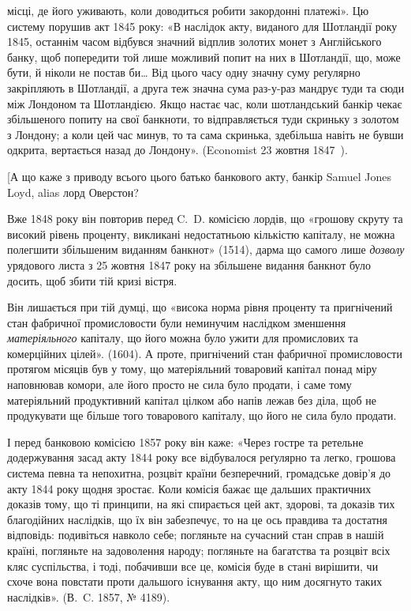 \parcont{}  %
місці, де його уживають, коли доводиться робити закордонні платежі». Цю систему
порушив акт 1845 року: «В наслідок акту, виданого для Шотландії
року 1845, останнім часом відбувся значний відплив золотих монет з Англійського
банку, щоб попередити той лише можливий попит на них в Шотландії,
що, може бути, й ніколи не постав би\dots{} Від цього часу одну значну суму
реґулярно закріпляють в Шотландії, а друга теж значна сума раз-у-раз мандрує
туди та сюди між Лондоном та Шотландією. Якщо настає час, коли шотландський
банкір чекає збільшеного попиту на свої банкноти, то відправляється
туди скриньку з золотом з Лондону; а коли цей час минув, то та сама скринька,
здебільша навіть не бувши одкрита, вертається назад до Лондону». (Economist
23 жовтня 1847~).

[А що каже з приводу всього цього батько банкового акту, банкір Samuel
Jones Loyd, alias лорд Оверстон?

Вже 1848 року він повторив перед C.~D. комісією лордів, що «грошову
скруту та високий рівень проценту, викликані недостатньою кількістю капіталу,
не можна полегшити збільшеним виданням банкнот» (1514), дарма що
самого лише \emph{дозволу} урядового листа з 25 жовтня 1847 року на збільшене
видання банкнот було досить, щоб збити тій кризі вістря.

Він лишається при тій думці, що «висока норма рівня проценту та пригнічений
стан фабричної промисловости були неминучим наслідком зменшення
\emph{матеріяльного} капіталу, що його можна було ужити для промислових та комерційних
цілей». (1604). А проте, пригнічений стан фабричної промисловости
протягом місяців був у тому, що матеріяльний товаровий капітал понад міру
наповнював комори, але його просто не сила було продати, і саме тому матеріяльний
продуктивний капітал цілком або напів лежав без діла, щоб не продукувати
ще більше того товарового капіталу, що його не сила було продати.

І перед банковою комісією 1857 року він каже: «Через гостре та ретельне
додержування засад акту 1844 року все відбувалося реґулярно та легко, грошова
система певна та непохитна, розцвіт країни безперечний, громадське довір’я
до акту 1844 року щодня зростає. Коли комісія бажає ще дальших
практичних доказів тому, що ті принципи, на які спирається цей акт, здорові,
та доказів тих благодійних наслідків, що їх він забезпечує, то на це ось правдива
та достатня відповідь: подивіться навколо себе; погляньте на сучасний
стан справ в нашій країні, погляньте на задоволення народу; погляньте на
багатства та розцвіт всіх кляс суспільства, і тоді, побачивши все це, комісія
буде в стані вирішити, чи схоче вона повстати проти дальшого існування акту,
що ним досягнуто таких наслідків». (В.~C. 1857, № 4189).

